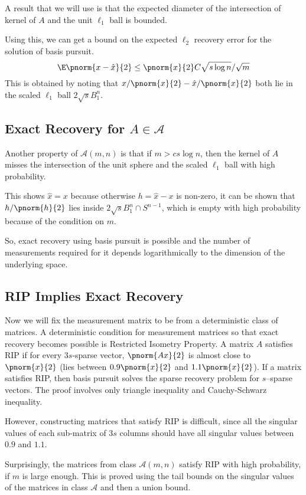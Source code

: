A result that we will use is that the expected diameter of the
intersection of kernel of $A$ and the unit
$\ell_1$ ball is bounded.

Using this, we can get a bound on the expected $\ell_2$ recovery
error for the solution of basis pursuit.
\[
	\E\pnorm{x-\hat{x}}{2}\leq \pnorm{x}{2}C\sqrt{s\log n}/\sqrt{m}
\]
This is obtained by noting that $x/\pnorm{x}{2}- \hat{x}
/\pnorm{x}{2}$ both lie in the scaled $\ell_1$ ball $2\sqrt{s}B_1^n$.


\subsection*{Exact Recovery for $A\in\mathcal{A}$}
Another property of $\mathcal{A}(m, n)$ 
is that if $m>cs\log n$, then the kernel of $A$ misses the
intersection of the unit sphere and the scaled $\ell_1$ ball
with high probability.

This shows $\hat{x} = x$ because otherwise
$h = \hat{x}-x$ is non-zero, it can be shown
that $h/\pnorm{h}{2}$ lies inside $2\sqrt{s}B_1^n\cap S^{n-1}$, which
is empty with high probability because of the condition on $m$.

So, exact recovery using basis pursuit is possible and the number of
measurements required for it depends logarithmically to the dimension
of the underlying space.

\subsection*{RIP Implies Exact Recovery}
Now we will fix the measurement matrix to be from a deterministic
class of matrices.
A deterministic condition for measurement matrices so
that exact recovery becomes possible is Restricted Isometry
Property. A matrix $A$ satisfies RIP if 
for every $3s$-sparse vector, $\pnorm{Ax}{2}$ is almost close
to $\pnorm{x}{2}$ (lies between $0.9\pnorm{x}{2}$ and
$1.1\pnorm{x}{2}$). If a matrix satisfies RIP, then basis
pursuit solves the sparse recovery problem for $s$--sparse
vectors. The proof involves only triangle inequality and
Cauchy-Schwarz inequality.

However, constructing matrices that satisfy RIP is difficult, since
all the singular values of each sub-matrix of $3s$ columns should
have all singular values between $0.9$ and $1.1$.

Surprisingly, the matrices from class $\mathcal{A}(m, n)$ satisfy
RIP with high probability, if $m$ is large enough.
This is proved using the tail bounds on the singular values of
the matrices in class $\mathcal{A}$ and then a union bound.


